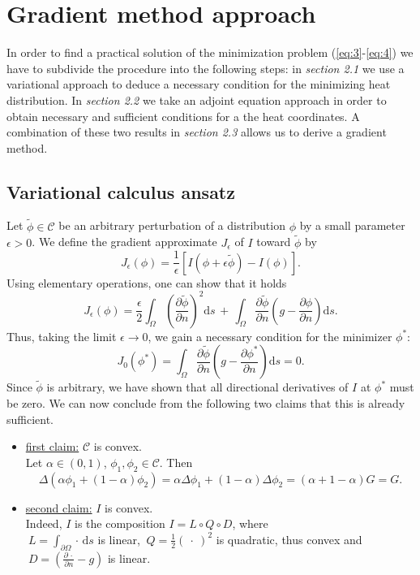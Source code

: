 \section{Gradient method approach}
In order to find a practical solution of the minimization problem (\ref{eq:3}-\ref{eq:4}) we have to subdivide the procedure into the following steps: in \textit{section 2.1} we use a variational approach to deduce a necessary condition for the minimizing heat distribution. In \textit{section 2.2} we take an adjoint equation approach in order to obtain necessary and sufficient conditions for a the heat coordinates. A combination of these two results in \textit{section 2.3} allows us to derive a gradient method.

\subsection{Variational calculus ansatz}
Let $\widetilde{\phi}\in\mathcal{C}$ be an arbitrary perturbation of a distribution $\phi$ by a small parameter $\epsilon>0$. We define the gradient approximate $J_\epsilon$ of $I$ toward $\widetilde{\phi}$ by
\begin{equation}\label{eq:5}
	J_\epsilon(\phi) =
	\frac{1}{\epsilon}
	\left[
		I(\phi+\epsilon\widetilde{\phi})-I(\phi)
	\right].
\end{equation}
Using elementary operations, one can show that it holds
\begin{equation}\label{eq:6}
	J_\epsilon(\phi) =
	\frac{\epsilon}{2}\int_\Omega \left(\frac{\partial\widetilde{\phi}}{\partial n}\right)^2 \mathrm{d}s
	\,+\,\int_{\Omega} \frac{\partial\widetilde{\phi}}{\partial n} 
		\left(g-\frac{\partial\phi}{\partial n}\right) \mathrm{d}s.
\end{equation}
Thus, taking the limit $\epsilon\to 0$, we gain a necessary condition for the minimizer $\phi^*$:
\begin{equation}\label{eq:7}
	J_0(\phi^*) = 
	\int_{\Omega} \frac{\partial\widetilde{\phi}}{\partial n} 
		\left(g-\frac{\partial\phi^*}{\partial n}\right) \mathrm{d}s
	= 0.
\end{equation}
Since $\widetilde{\phi}$ is arbitrary, we have shown that all directional derivatives of $I$ at $\phi^*$ must be zero. We can now conclude from the following two claims that this is already sufficient. 
\begin{itemize}
	\item \underline{first claim:} $\mathcal C$ is convex.\\
	Let $\alpha\in(0,1)$, $\phi_1,\phi_2\in\mathcal C$. Then
	\begin{equation*}
		\Delta \left(\alpha\phi_1 + (1-\alpha)\phi_2\right)
		= \alpha \Delta \phi_1 + (1-\alpha)\Delta\phi_2
		= (\alpha + 1 - \alpha)G = G.
	\end{equation*}
	\item \underline{second claim:} $I$ is convex.\\
	Indeed, $I$ is the composition $I = L\circ Q\circ D$, where\\
	$\:L=\int_{\partial\Omega}\cdot\,\mathrm ds$ is linear, $\:Q=\frac{1}{2}(\:\cdot\:)^2$ is quadratic, thus convex and $\:D=(\frac{\partial\,\cdot}{\partial n}-g)$ is linear.
\end{itemize}

